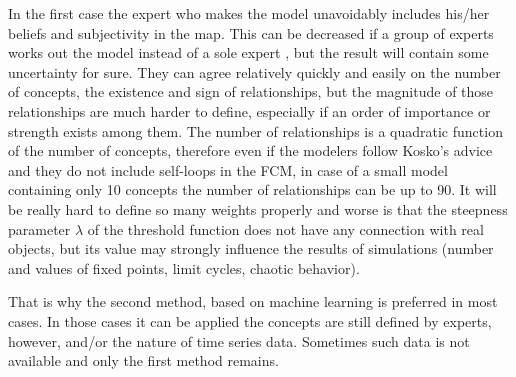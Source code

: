 \documentclass[graybox]{svmult}
\begin{document}
In the first case the expert who makes the model unavoidably 
includes his/her beliefs and subjectivity in the map. This can be 
decreased if a group of experts works out the model instead of a 
sole expert \cite{kosko1988hidden,groumpos2010fuzzy}, but the result 
will contain some uncertainty for sure. They can agree relatively 
quickly and easily on the number of concepts, the existence and sign 
of relationships, but the magnitude of those relationships are much 
harder to define, especially if an order of importance or strength 
exists among them. The number of relationships is a quadratic 
function of the number of concepts, therefore even if the modelers 
follow Kosko's advice and they do not include self-loops in the FCM, 
in case of a small model containing only 10 concepts the number of 
relationships can be up to 90. It will be really hard to define so 
many weights properly and worse is that the steepness parameter 
$\lambda$ of the threshold function does not have any connection 
with real objects, but its value may strongly influence the results 
of simulations (number and values of fixed points, limit cycles, 
chaotic behavior).

That is why the second method, based on machine learning is preferred 
in most cases. In those cases it can be applied the concepts 
are still defined by experts, however, and/or the nature of time series data. 
Sometimes such data is not available and only the first method 
remains.
\end{document}
